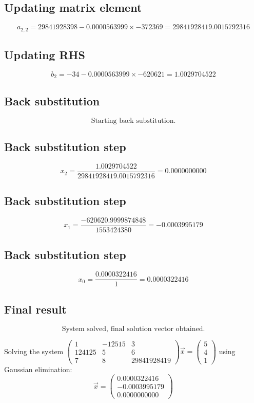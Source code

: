 \documentclass{article}
\begin{document}
\subsection*{ \vspace{1em} Updating matrix element}
\[
a_{2,2} = 29841928398 - 0.0000563999 \times -372369 = 29841928419.0015792316
\]
\subsection*{ \vspace{1em} Updating RHS}
\[
b_{2} = -34 - 0.0000563999 \times -620621 = 1.0029704522
\]
\subsection*{ \vspace{1em} Back substitution}
\[
\text{Starting back substitution.}
\]
\subsection*{ \vspace{1em} Back substitution step}
\[
x_{2} = \frac{1.0029704522}{29841928419.0015792316} = 0.0000000000
\]
\subsection*{ \vspace{1em} Back substitution step}
\[
x_{1} = \frac{-620620.9999874848}{1553424380} = -0.0003995179
\]
\subsection*{ \vspace{1em} Back substitution step}
\[
x_{0} = \frac{0.0000322416}{1} = 0.0000322416
\]
\subsection*{ \vspace{1em} Final result}
\[
\text{System solved, final solution vector obtained.}
\]
\medskip

Solving the system $\begin{pmatrix}1 & -12515 & 3 \\ 124125 & 5 & 6 \\ 7 & 8 & 29841928419\end{pmatrix}\vec{x} = \begin{pmatrix}5 \\ 4 \\ 1\end{pmatrix}$ using Gaussian elimination:
\[
\vec{x} = \begin{pmatrix}0.0000322416 \\ -0.0003995179 \\ 0.0000000000\end{pmatrix}
\]
\bigskip
\end{document}
